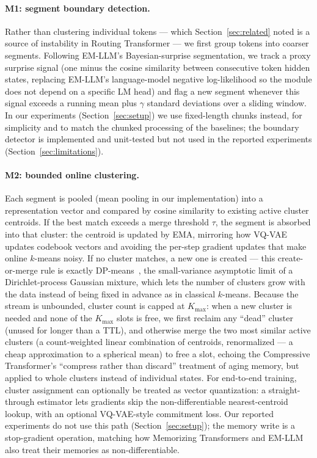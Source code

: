 \documentclass[11pt]{article}
\begin{document}
\paragraph{M1: segment boundary detection.}
Rather than clustering individual tokens --- which Section~\ref{sec:related} noted is a source
of instability in Routing Transformer --- we first group tokens into coarser segments. Following
EM-LLM's Bayesian-surprise segmentation, we track a proxy surprise signal (one minus the cosine
similarity between consecutive token hidden states, replacing EM-LLM's language-model
negative log-likelihood so the module does not depend on a specific LM head) and flag a new
segment whenever this signal exceeds a running mean plus $\gamma$ standard deviations over a
sliding window. In our experiments (Section~\ref{sec:setup}) we use fixed-length chunks instead,
for simplicity and to match the chunked processing of the baselines; the boundary detector is
implemented and unit-tested but not used in the reported experiments (Section~\ref{sec:limitations}).

\paragraph{M2: bounded online clustering.}
Each segment is pooled (mean pooling in our implementation) into a representation vector and
compared by cosine similarity to existing active cluster centroids. If the best match exceeds a
merge threshold $\tau$, the segment is absorbed into that cluster: the centroid is updated by
EMA, mirroring how VQ-VAE~\citep{vqvae2017} updates codebook vectors and avoiding the
per-step gradient updates that make online $k$-means noisy. If no cluster matches, a new one is
created --- this create-or-merge rule is exactly DP-means~\citep{dpmeans2012}, the
small-variance asymptotic limit of a Dirichlet-process Gaussian mixture, which lets the number
of clusters grow with the data instead of being fixed in advance as in classical $k$-means.
Because the stream is unbounded, cluster count is capped at $K_{\max}$: when a new cluster is
needed and none of the $K_{\max}$ slots is free, we first reclaim any ``dead'' cluster (unused
for longer than a TTL), and otherwise merge the two most similar active clusters (a
count-weighted linear combination of centroids, renormalized --- a cheap approximation to a
spherical mean) to free a slot, echoing the Compressive Transformer's ``compress rather than
discard'' treatment of aging memory, but applied to whole clusters instead of individual states.
For end-to-end training, cluster assignment can optionally be treated as vector quantization:
a straight-through estimator lets gradients skip the non-differentiable nearest-centroid lookup,
with an optional VQ-VAE-style commitment loss. Our reported experiments do not use this path
(Section~\ref{sec:setup}); the memory write is a stop-gradient operation, matching how
Memorizing Transformers and EM-LLM also treat their memories as non-differentiable.
\end{document}
